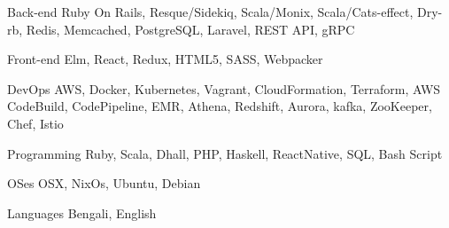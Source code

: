 

\begin{cvskills}

  \cvskill
    {Back-end} %
    {Ruby On Rails, Resque/Sidekiq, Scala/Monix, Scala/Cats-effect, Dry-rb, Redis, Memcached, PostgreSQL, Laravel, REST API, gRPC} %

  \cvskill
    {Front-end} %
    {Elm, React, Redux, HTML5, SASS, Webpacker} %

  \cvskill
    {DevOps} %
    {AWS, Docker, Kubernetes, Vagrant, CloudFormation, Terraform, AWS CodeBuild, CodePipeline, EMR, Athena, Redshift, Aurora, kafka, ZooKeeper, Chef, Istio} %

  \cvskill
    {Programming} %
    {Ruby, Scala, Dhall, PHP, Haskell, ReactNative, SQL, Bash Script} %

  \cvskill
    {OSes} %
    {OSX, NixOs, Ubuntu, Debian} %

  \cvskill
    {Languages} %
    {Bengali, English} %

\end{cvskills}

